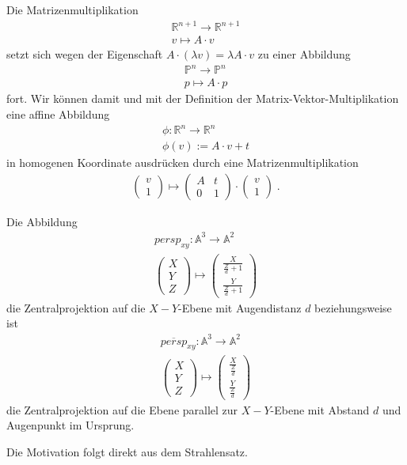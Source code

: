 Die Matrizenmultiplikation
\begin{align*}
\mathbb{R}^{n+1} \to \mathbb{R}^{n+1} \\
v \mapsto A \cdot v
\end{align*}
setzt sich wegen der Eigenschaft $A \cdot (\lambda v) = \lambda A \cdot v$ zu einer Abbildung
\begin{align*}
\mathbb{P}^{n} \to \mathbb{P}^{n} \\
p \mapsto A \cdot p
\end{align*}
fort. Wir können damit und mit der Definition der Matrix-Vektor-Multiplikation eine affine Abbildung 
\begin{align*}
\phi : \mathbb{R}^{n} \to \mathbb{R}^{n} \\
\phi(v):=  A \cdot v + t
\end{align*}
in homogenen Koordinate ausdrücken durch eine Matrizenmultiplikation
\begin{align*}
\begin{pmatrix} v \\ 1\end{pmatrix} \mapsto \begin{pmatrix}  A  & t  \\ 0 &1\end{pmatrix} \cdot  \begin{pmatrix} v \\ 1\end{pmatrix}   \; .
\end{align*}

\begin{Definition}
Die Abbildung 
\begin{align*}
persp_{xy} : \mathbb{A}^3 \to \mathbb{A}^2 \\
\begin{pmatrix}  X \\ Y \\ Z\end{pmatrix}  \mapsto \begin{pmatrix}  \frac{X}{\frac{Z}{d} +1 } \\   \frac{Y}{\frac{Z}{d} +1 } \end{pmatrix}
\end{align*}
die Zentralprojektion auf die $X-Y$-Ebene mit Augendistanz $d$ beziehungsweise ist
\begin{align*}
\overline{persp}_{xy} : \mathbb{A}^3 \to \mathbb{A}^2 \\
\begin{pmatrix}  X \\ Y \\ Z\end{pmatrix}  \mapsto \begin{pmatrix}  \frac{X}{\frac{Z}{d}  } \\   \frac{Y}{\frac{Z}{d}  } \end{pmatrix}
\end{align*}  die Zentralprojektion auf die Ebene parallel zur $X-Y$-Ebene mit Abstand $d$ und  Augenpunkt im Ursprung.
\end{Definition} 
Die Motivation folgt direkt aus dem Strahlensatz.

